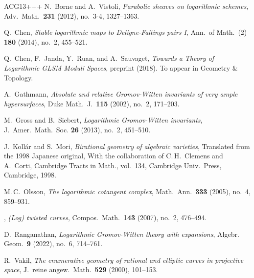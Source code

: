 \documentclass[11pt]{amsart}
\numberwithin{equation}{section}
\theoremstyle{definition}
\theoremstyle{remark}
\begin{document}
\begin{thebibliography}{ACG{\etalchar{+}}13+++}
N.~Borne and A.~Vistoli, \emph{Parabolic sheaves on logarithmic schemes}, Adv.\
  Math.\ \textbf{231} (2012), no.~3-4, 1327--1363.

Q.~Chen, \emph{Stable logarithmic maps to {D}eligne-{F}altings pairs {I}}, Ann.\
  of Math.\ (2) \textbf{180} (2014), no.~2, 455--521.

Q.~Chen, F.~Janda, Y.~Ruan, and A.~Sauvaget, \emph{Towards a Theory of
  Logarithmic GLSM Moduli Spaces}, preprint  (2018). To appear in Geometry \& Topology.

\bibitem[Gat02]{Gathmann}
A.~Gathmann, \emph{Absolute and relative {G}romov-{W}itten invariants of very
  ample hypersurfaces}, Duke Math.\ J.\ \textbf{115} (2002), no.~2, 171--203.

\bibitem[GS13]{GS}
M.~Gross and B.~Siebert, \emph{Logarithmic {G}romov-{W}itten invariants},
  J.~Amer.\ Math.\ Soc. \textbf{26} (2013), no.~2,
  451--510.

J.~Koll\'{a}r and S.~Mori, \emph{Birational geometry of algebraic varieties}, Translated from the 1998 Japanese original, With the collaboration of C.\,H.~Clemens and A.~Corti,   Cambridge Tracts in Math., vol.~134, Cambridge Univ.\ Press,
  Cambridge, 1998.

M.\,C.~Olsson, \emph{The logarithmic cotangent complex}, Math.\ Ann.\ \textbf{333} (2005), no.~4, 859--931.

\bibitem[Ols07]{Olsson}
\bysame, \emph{({L}og) twisted curves}, Compos.\ Math.\ \textbf{143} (2007),
  no.~2, 476--494.

  D.~Ranganathan, \emph{Logarithmic Gromov-Witten theory with expansions}, Algebr. Geom.~\textbf{9} (2022), no.~6, 714--761.

\bibitem[Vak00]{Vakil}
R.~Vakil, \emph{The enumerative geometry of rational and elliptic curves in
  projective space}, J.~reine angew.\ Math.\ \textbf{529} (2000), 101--153.

\end{thebibliography}
\end{document}

